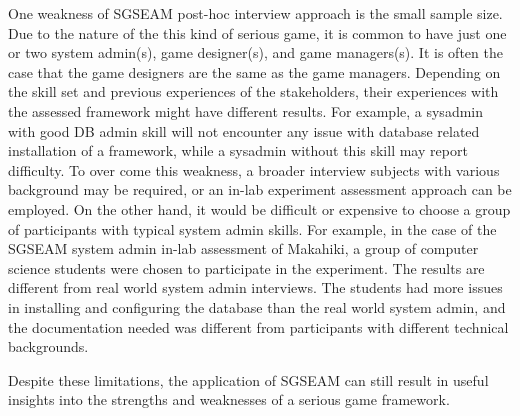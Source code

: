 One weakness of SGSEAM post-hoc interview approach is the small sample size. Due to the nature of the this kind of serious game, it is common to have just one or two system admin(s), game designer(s), and game managers(s). It is often the case that the game designers are the same as the game managers. Depending on the skill set and previous experiences of the stakeholders, their experiences with the assessed framework might have different results. For example, a sysadmin with good DB admin skill will not encounter any issue with database related installation of a framework, while a sysadmin without this skill may report difficulty. To over come this weakness, a broader interview subjects with various background may be required, or an in-lab experiment assessment approach can be employed. On the other hand, it would be difficult or expensive to choose a group of participants with typical system admin skills. For example, in the case of the SGSEAM system admin in-lab  assessment of Makahiki, a group of computer science students were chosen to participate in the experiment. The results are different from real world system admin interviews. The students had more issues in installing and configuring the database than the real world system admin, and the documentation needed was different from participants with different technical backgrounds.

Despite these limitations, the application of SGSEAM can still result in useful insights into the strengths and weaknesses of a serious game framework.
